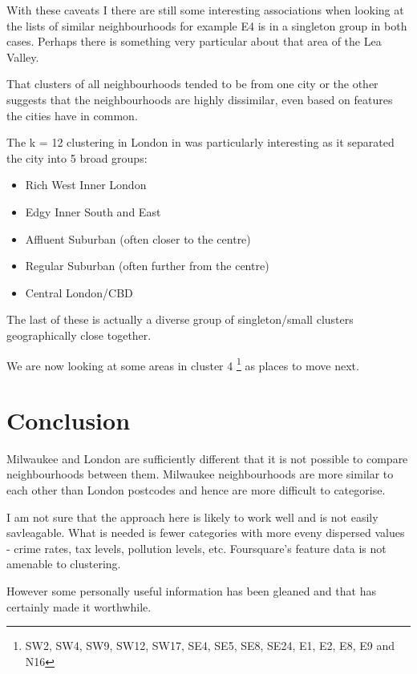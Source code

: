 \documentclass[a4paper,12pt,final,UKenglish]{article}
\begin{document}
            With these caveats I there are still some interesting associations when looking at the lists of similar neighbourhoods for example E4
            is in a singleton group in both cases.  Perhaps there is something very particular about that area of the Lea Valley.
            
            That clusters of all neighbourhoods tended to be from one city or the other suggests that the neighbourhoods are highly dissimilar,
            even based on features the cities have in common.

            The k = 12 clustering in London in  was particularly interesting as it separated the city into 5 broad groups:
            \begin{itemize}
            	\item Rich West Inner London
            	\item Edgy Inner South and East
            	\item Affluent Suburban (often closer to the centre)
            	\item Regular Suburban (often further from the centre)
            	\item Central London/CBD
            \end{itemize}
            The last of these is actually a diverse group of singleton/small clusters geographically close together.

            We are now looking at some areas in cluster 4 \footnote{SW2, SW4, SW9, SW12, SW17, SE4, SE5, SE8, SE24, E1, E2, E8, E9 and N16} as places to move next.
    \section{Conclusion}
        Milwaukee and London are sufficiently different that it is not possible to compare neighbourhoods between them.
        Milwaukee neighbourhoods are more similar to each other than London postcodes and hence are more difficult to categorise.

        I am not sure that the approach here is likely to work well and is not easily savleagable.
        What is needed is fewer categories with more eveny dispersed values - crime rates, tax levels, pollution levels, etc.
        Foursquare's feature data is not amenable to clustering.

        However some personally useful information has been gleaned and that has certainly made it worthwhile.
\end{document}
